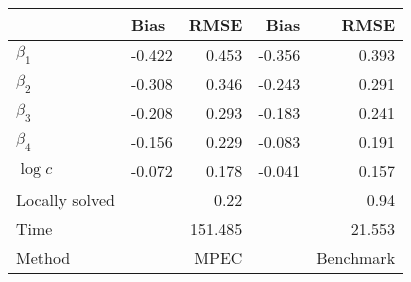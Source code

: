 
\begin{tabular}[t]{llrrr}
\toprule
  & Bias & RMSE & Bias & RMSE\\
\midrule
$\beta_{1}$ & -0.422 & 0.453 & -0.356 & 0.393\\
$\beta_{2}$ & -0.308 & 0.346 & -0.243 & 0.291\\
$\beta_{3}$ & -0.208 & 0.293 & -0.183 & 0.241\\
$\beta_{4}$ & -0.156 & 0.229 & -0.083 & 0.191\\
$\log c$ & -0.072 & 0.178 & -0.041 & 0.157\\
Locally solved &  & 0.22 &  & 0.94\\
Time &  & 151.485 &  & 21.553\\
Method &  & MPEC &  & Benchmark\\
\bottomrule
\end{tabular}
